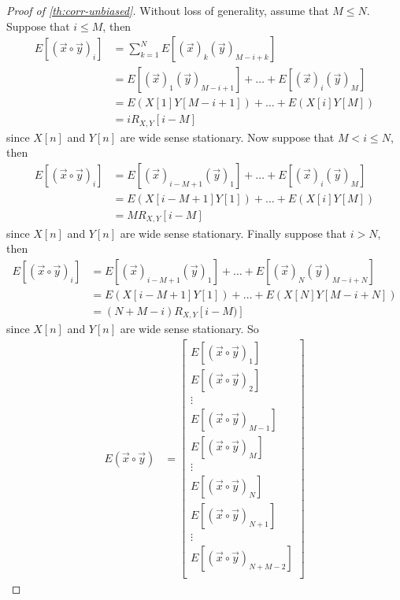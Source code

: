 \documentclass[a4paper, openany, oneside]{memoir}
\begin{document}
\begin{proof}[Proof of \cref{th:corr-unbiased}]
    Without loss of generality, assume that $M \le N$. Suppose that $i \le M$, then
    \begin{align*}
        E[(\vec{x} \circ \vec{y})_i] &= \sum_{k=1}^N E[(\vec{x})_k (\vec{y})_{M-i+k}] \\
        &= E[(\vec{x})_1 (\vec{y})_{M-i+1}] + \ldots + E[(\vec{x})_i (\vec{y})_{M}] \\
        &= E(X[1] Y[M-i+1]) + \ldots + E(X[i] Y[M])  \\
        &= i R_{X,Y}[i-M]
    \end{align*}
    since $X[n]$ and $Y[n]$ are wide sense stationary. Now suppose that $M < i \le N$, then
    \begin{align*}
        E[(\vec{x} \circ \vec{y})_i] &= E[(\vec{x})_{i-M+1} (\vec{y})_{1}] + \ldots + E[(\vec{x})_i (\vec{y})_{M}] \\
        &= E(X[i-M+1] Y[1]) + \ldots + E(X[i] Y[M]) \\  
        &= M R_{X,Y}[i-M]
    \end{align*}
    since $X[n]$ and $Y[n]$ are wide sense stationary. Finally suppose that $i > N$, then
    \begin{align*}
        E[(\vec{x} \circ \vec{y})_i] &= E[(\vec{x})_{i-M+1} (\vec{y})_{1}] + \ldots + E[(\vec{x})_N (\vec{y})_{M-i+N}] \\
        &= E(X[i-M+1] Y[1]) + \ldots + E(X[N] Y[M-i+N]) \\
        &= (N+M-i) R_{X,Y}[i-M)]
    \end{align*}
    since $X[n]$ and $Y[n]$ are wide sense stationary. So
    \begin{align*}
        E(\vec{x} \circ \vec{y}) &= \begin{bmatrix}
            E[(\vec{x} \circ \vec{y})_1] \\
            E[(\vec{x} \circ \vec{y})_2] \\
            \vdots \\
            E[(\vec{x} \circ \vec{y})_{M-1}] \\
            E[(\vec{x} \circ \vec{y})_{M}] \\
            \vdots \\
            E[(\vec{x} \circ \vec{y})_N] \\
            E[(\vec{x} \circ \vec{y})_{N+1}] \\
            \vdots \\
            E[(\vec{x} \circ \vec{y})_{N+M-2}] \\

\end{bmatrix}
\end{align*}
\end{proof}
\end{document}
